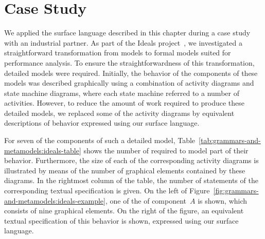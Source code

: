 \section{Case Study}
\label{sec:grammars-and-metamodels:Case-Study}
We applied the surface language described in this chapter during a case study with an industrial partner.
As part of the Ideals project~\cite{Ideals2007}, we investigated a straightforward transformation from \UML models to formal models suited for performance analysis.
To ensure the straightforwardness of this transformation, detailed \UML models were required.
Initially, the behavior of the components of these models was described graphically using a combination of activity diagrams and state machine diagrams, where each state machine referred to a number of activities.
However, to reduce the amount of work required to produce these detailed models, we replaced some of the activity diagrams by equivalent descriptions of behavior expressed using our surface language.

For seven of the components of such a detailed \UML model, Table~\ref{tab:grammars-and-metamodels:ideals-table} shows the number of \Activities required to model part of their behavior.
Furthermore, the size of each of the corresponding activity diagrams is illustrated by means of the number of graphical elements contained by these diagrams.
In the rightmost column of the table, the number of statements of the corresponding textual specification is given.
On the left of Figure~\ref{fig:grammars-and-metamodels:ideals-example}, one of the \Activities of component~$A$ is shown, which consists of nine graphical elements.
On the right of the figure, an equivalent textual specification of this behavior is shown, expressed using our surface language.

